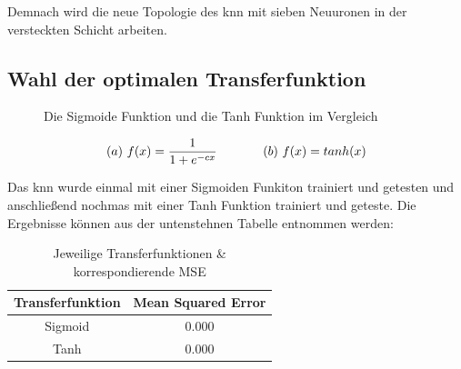 Demnach wird die neue Topologie des \acs{knn} mit sieben Neuuronen in der versteckten Schicht arbeiten.



\subsection{Wahl der optimalen Transferfunktion} 
\label{subsection:Wahl der optimalen Transferfunktion} 


\begin{figure}[H]
\hfill
{}
\hfill
{}
\hfill
\caption{Die Sigmoide Funktion und die Tanh Funktion im Vergleich}
\end{figure}


\begin{equation}\formelentry{Sigmoide Funktion sowie Tanh Funktion}
(a)\ f(x)= \frac{1}{1+e^{-cx}}\ \ \ \ \ \ \ \ \ \ \ (b)\ f(x)= tanh(x)
\end{equation}

Das \acs{knn} wurde einmal mit einer Sigmoiden Funkiton trainiert und getesten und anschließend nochmas mit einer Tanh Funktion trainiert und geteste. Die Ergebnisse können aus der untenstehnen Tabelle entnommen werden:

\begin{table}[H]
  \centering
  \begin{tabular}{|c|c|}
  \hline 
  \rule[0ex]{0pt}{2.5ex} Transferfunktion & Mean Squared Error \\ 
  \hline 
  \rule[0ex]{0pt}{2.5ex} Sigmoid & 0.000 \\ 
  \hline 
  \rule[0ex]{0pt}{2.5ex} Tanh & 0.000 \\ 
  \hline 
  \end{tabular} 
  \caption{Jeweilige Transferfunktionen \& korrespondierende MSE}
  \label{tab:TRANSMSE}
\end{table}


